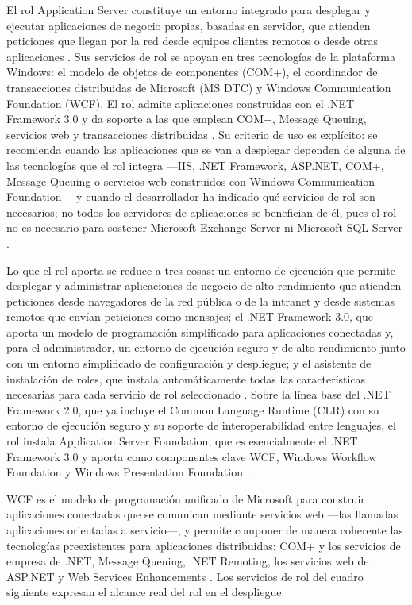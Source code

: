 \documentclass[12pt]{article}
\begin{document}
El rol Application Server constituye un entorno integrado para desplegar y ejecutar aplicaciones de negocio propias, basadas en servidor, que atienden peticiones que llegan por la red desde equipos clientes remotos o desde otras aplicaciones \parencite{microsoftApplicationServerRole} \parencite{microsoftRoleApplicationServer}. Sus servicios de rol se apoyan en tres tecnologías de la plataforma Windows: el modelo de objetos de componentes (COM+), el coordinador de transacciones distribuidas de Microsoft (MS DTC) y Windows Communication Foundation (WCF). El rol admite aplicaciones construidas con el .NET Framework 3.0 y da soporte a las que emplean COM+, Message Queuing, servicios web y transacciones distribuidas \parencite{microsoftRoleApplicationServer}. Su criterio de uso es explícito: se recomienda cuando las aplicaciones que se van a desplegar dependen de alguna de las tecnologías que el rol integra ---IIS, .NET Framework, ASP.NET, COM+, Message Queuing o servicios web construidos con Windows Communication Foundation--- y cuando el desarrollador ha indicado qué servicios de rol son necesarios; no todos los servidores de aplicaciones se benefician de él, pues el rol no es necesario para sostener Microsoft Exchange Server ni Microsoft SQL Server \parencite{microsoftApplicationServerRole}.

Lo que el rol aporta se reduce a tres cosas: un entorno de ejecución que permite desplegar y administrar aplicaciones de negocio de alto rendimiento que atienden peticiones desde navegadores de la red pública o de la intranet y desde sistemas remotos que envían peticiones como mensajes; el .NET Framework 3.0, que aporta un modelo de programación simplificado para aplicaciones conectadas y, para el administrador, un entorno de ejecución seguro y de alto rendimiento junto con un entorno simplificado de configuración y despliegue; y el asistente de instalación de roles, que instala automáticamente todas las características necesarias para cada servicio de rol seleccionado \parencite{microsoftApplicationServerRole}. Sobre la línea base del .NET Framework 2.0, que ya incluye el Common Language Runtime (CLR) con su entorno de ejecución seguro y su soporte de interoperabilidad entre lenguajes, el rol instala Application Server Foundation, que es esencialmente el .NET Framework 3.0 y aporta como componentes clave WCF, Windows Workflow Foundation y Windows Presentation Foundation \parencite{microsoftApplicationServerRole}.

WCF es el modelo de programación unificado de Microsoft para construir aplicaciones conectadas que se comunican mediante servicios web ---las llamadas aplicaciones orientadas a servicio---, y permite componer de manera coherente las tecnologías preexistentes para aplicaciones distribuidas: COM+ y los servicios de empresa de .NET, Message Queuing, .NET Remoting, los servicios web de ASP.NET y Web Services Enhancements \parencite{microsoftApplicationServerRole}. Los servicios de rol del cuadro siguiente expresan el alcance real del rol en el despliegue.
\end{document}

